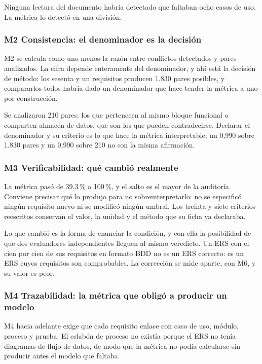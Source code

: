 Ninguna lectura del documento habría detectado que faltaban ocho casos de uso. La métrica lo detectó
en una división.

\subsubsection*{M2 Consistencia: el denominador es la decisión}

M2 se calcula como uno menos la razón entre conflictos detectados y pares analizados. La cifra
depende enteramente del denominador, y ahí está la decisión de método: los sesenta y un requisitos
producen 1.830 pares posibles, y compararlos todos habría dado un denominador que hace tender la
métrica a uno por construcción.

Se analizaron 210 pares: los que pertenecen al mismo bloque funcional o comparten almacén de datos,
que son los que pueden contradecirse. Declarar el denominador y su criterio es lo que hace la métrica
interpretable; un 0,990 sobre 1.830 pares y un 0,990 sobre 210 no son la misma afirmación.

\subsubsection*{M3 Verificabilidad: qué cambió realmente}

La métrica pasó de 39,3\,\% a 100\,\%, y el salto es el mayor de la auditoría. Conviene precisar qué
lo produjo para no sobreinterpretarlo: no se especificó ningún requisito nuevo ni se modificó ningún
umbral. Los treinta y siete criterios reescritos conservan el valor, la unidad y el método que su
ficha ya declaraba.

Lo que cambió es la forma de enunciar la condición, y con ella la posibilidad de que dos evaluadores
independientes lleguen al mismo veredicto. Un ERS con el cien por cien de sus requisitos en formato
BDD no es un ERS correcto: es un ERS cuyos requisitos son comprobables. La corrección se mide aparte,
con M6, y su valor es peor.

\subsubsection*{M4 Trazabilidad: la métrica que obligó a producir un modelo}

M4 hacia adelante exige que cada requisito enlace con caso de uso, módulo, proceso y prueba. El
eslabón de proceso no existía porque el ERS no tenía diagramas de flujo de datos, de modo que la
métrica no podía calcularse sin producir antes el modelo que faltaba.

